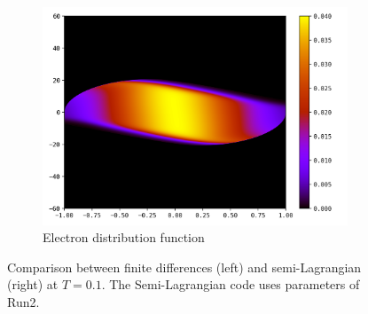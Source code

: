 \documentclass{article}
\numberwithin{equation}{section}
\newcommand{\imh}{\textheight} %
\newcommand{\imw}{\textwidth} %
\begin{document}
\begin{figure}
\begin{subfigure}{\textwidth}
		\includegraphics[height=\imh,width=\imw]{images/feT0p1.png}
		\caption{Electron distribution function}
		\label{subfig:compT01_electron}
	\end{subfigure}
	\caption{Comparison between finite differences (left) and semi-Lagrangian (right) at $T=0.1$. The Semi-Lagrangian code uses parameters of Run2.}
	\label{fig:compT01}
\end{figure}  
\end{document}
